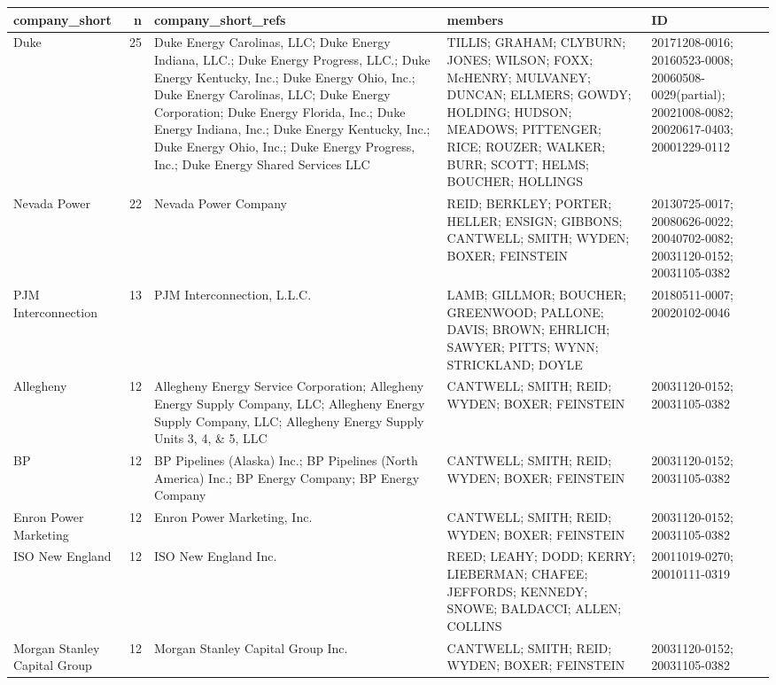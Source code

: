 \documentclass[]{article}
\newenvironment{Shaded}{\begin{snugshade}}{\end{snugshade}}
\newcommand{\CommentTok}[1]{\textcolor[rgb]{0.56,0.35,0.01}{\textit{#1}}}
\newcommand{\NormalTok}[1]{#1}
\begin{document}
\begin{longtable}[]{@{}lrlll@{}}
\toprule
company\_short & n & company\_short\_refs & members & ID\tabularnewline
\midrule
\endhead
Duke & 25 & Duke Energy Carolinas, LLC; Duke Energy Indiana, LLC.; Duke
Energy Progress, LLC.; Duke Energy Kentucky, Inc.; Duke Energy Ohio,
Inc.; Duke Energy Carolinas, LLC; Duke Energy Corporation; Duke Energy
Florida, Inc.; Duke Energy Indiana, Inc.; Duke Energy Kentucky, Inc.;
Duke Energy Ohio, Inc.; Duke Energy Progress, Inc.; Duke Energy Shared
Services LLC & TILLIS; GRAHAM; CLYBURN; JONES; WILSON; FOXX; McHENRY;
MULVANEY; DUNCAN; ELLMERS; GOWDY; HOLDING; HUDSON; MEADOWS; PITTENGER;
RICE; ROUZER; WALKER; BURR; SCOTT; HELMS; BOUCHER; HOLLINGS &
20171208-0016; 20160523-0008; 20060508-0029(partial); 20021008-0082;
20020617-0403; 20001229-0112\tabularnewline
Nevada Power & 22 & Nevada Power Company & REID; BERKLEY; PORTER;
HELLER; ENSIGN; GIBBONS; CANTWELL; SMITH; WYDEN; BOXER; FEINSTEIN &
20130725-0017; 20080626-0022; 20040702-0082; 20031120-0152;
20031105-0382\tabularnewline
PJM Interconnection & 13 & PJM Interconnection, L.L.C. & LAMB; GILLMOR;
BOUCHER; GREENWOOD; PALLONE; DAVIS; BROWN; EHRLICH; SAWYER; PITTS; WYNN;
STRICKLAND; DOYLE & 20180511-0007; 20020102-0046\tabularnewline
Allegheny & 12 & Allegheny Energy Service Corporation; Allegheny Energy
Supply Company, LLC; Allegheny Energy Supply Company, LLC; Allegheny
Energy Supply Units 3, 4, \& 5, LLC & CANTWELL; SMITH; REID; WYDEN;
BOXER; FEINSTEIN & 20031120-0152; 20031105-0382\tabularnewline
BP & 12 & BP Pipelines (Alaska) Inc.; BP Pipelines (North America) Inc.;
BP Energy Company; BP Energy Company & CANTWELL; SMITH; REID; WYDEN;
BOXER; FEINSTEIN & 20031120-0152; 20031105-0382\tabularnewline
Enron Power Marketing & 12 & Enron Power Marketing, Inc. & CANTWELL;
SMITH; REID; WYDEN; BOXER; FEINSTEIN & 20031120-0152;
20031105-0382\tabularnewline
ISO New England & 12 & ISO New England Inc. & REED; LEAHY; DODD; KERRY;
LIEBERMAN; CHAFEE; JEFFORDS; KENNEDY; SNOWE; BALDACCI; ALLEN; COLLINS &
20011019-0270; 20010111-0319\tabularnewline
Morgan Stanley Capital Group & 12 & Morgan Stanley Capital Group Inc. &
CANTWELL; SMITH; REID; WYDEN; BOXER; FEINSTEIN & 20031120-0152;
20031105-0382\tabularnewline
\bottomrule
\end{longtable}

\begin{Shaded}
\end{Shaded}
\end{document}
